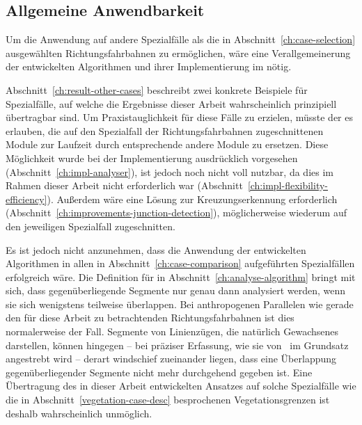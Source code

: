 \documentclass[../main/thesis.tex]{subfiles}
\begin{document}



\subsection{Allgemeine Anwendbarkeit}

Um die Anwendung auf andere Spezialfälle als die in Abschnitt~\ref{ch:case-selection} ausgewählten Richtungsfahrbahnen zu ermöglichen, wäre eine Verallgemeinerung der entwickelten Algorithmen und ihrer Implementierung im  nötig.

Abschnitt~\ref{ch:result-other-cases} beschreibt zwei konkrete Beispiele für Spezialfälle, auf welche die Ergebnisse dieser Arbeit wahrscheinlich prinzipiell übertragbar sind.
Um Praxistauglichkeit für diese Fälle zu erzielen, müsste der  es erlauben, die auf den Spezialfall der Richtungsfahrbahnen zugeschnittenen Module zur Laufzeit durch entsprechende andere Module zu ersetzen.
Diese Möglichkeit wurde bei der Implementierung ausdrücklich vorgesehen (Abschnitt~\ref{ch:impl-analyser}), ist jedoch noch nicht voll nutzbar, da dies im Rahmen dieser Arbeit nicht erforderlich war (Abschnitt~\ref{ch:impl-flexibility-efficiency}).
Außerdem wäre eine Lösung zur Kreuzungserkennung erforderlich (Abschnitt~\ref{ch:improvements-junction-detection}), möglicherweise wiederum auf den jeweiligen Spezialfall zugeschnitten.

Es ist jedoch nicht anzunehmen, dass die Anwendung der entwickelten Algorithmen in allen in Abschnitt~\ref{ch:case-comparison} aufgeführten Spezialfällen erfolgreich wäre.
Die Definition für  in Abschnitt~\ref{ch:analyse-algorithm} bringt mit sich, dass gegenüberliegende Segmente nur genau dann analysiert werden, wenn sie sich wenigstens teilweise überlappen.
Bei anthropogenen Parallelen wie gerade den für diese Arbeit zu betrachtenden Richtungsfahrbahnen ist dies normalerweise der Fall.
Segmente von Linienzügen, die natürlich Gewachsenes darstellen, können hingegen -- bei präziser Erfassung, wie sie von \osm\ im Grundsatz angestrebt wird -- derart windschief zueinander liegen, dass eine Überlappung gegenüberliegender Segmente nicht mehr durchgehend gegeben ist.
Eine Übertragung des in dieser Arbeit entwickelten Ansatzes auf solche Spezialfälle wie die in Abschnitt~\ref{vegetation-case-desc} besprochenen Vegetationsgrenzen ist deshalb wahrscheinlich unmöglich.
\end{document}
